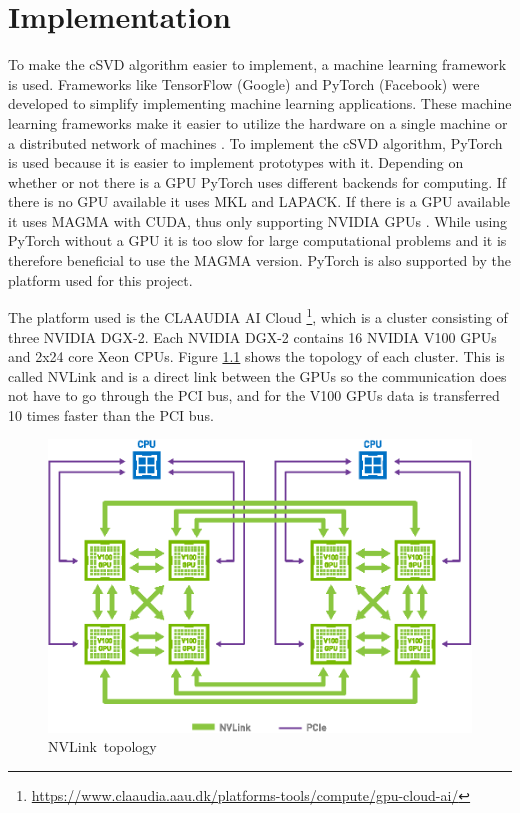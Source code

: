 \chapter{Implementation}

To make the cSVD algorithm easier to implement, a machine learning framework is used. Frameworks like TensorFlow (Google) \cite{tensorflow:about} and PyTorch (Facebook) \cite{pytorch:docs} were developed to simplify implementing machine learning applications. These machine learning frameworks make it easier to utilize the hardware on a single machine or a distributed network of machines \cite{pytorch:docs}. To implement the cSVD algorithm, PyTorch is used because it is easier to implement prototypes with it.  Depending on whether or not there is a GPU PyTorch uses different backends for computing. If there is no GPU available it uses MKL and LAPACK. If there is a GPU available it uses MAGMA with CUDA, thus only supporting NVIDIA GPUs \cite{pytorch:docs}. While using PyTorch without a GPU it is too slow for large computational problems and it is therefore beneficial to use the MAGMA version. PyTorch is also supported by the platform used for this project.

The platform used is the CLAAUDIA AI Cloud \footnote{\url{https://www.claaudia.aau.dk/platforms-tools/compute/gpu-cloud-ai/}}, which is a cluster consisting of three NVIDIA DGX-2. Each NVIDIA DGX-2 contains 16 NVIDIA V100 GPUs and 2x24 core Xeon CPUs. Figure \ref{fig:nvlink} shows the topology of each cluster. This is called NVLink and is a direct link between the GPUs so the communication does not have to go through the PCI bus, and for the V100 GPUs data is transferred 10 times faster than the PCI bus.

\begin{figure}[H]
  \centering
  \includegraphics[scale=0.6]{Figures/nvlink.eps}
  \caption[]{NVLink\protect\footnotemark\ topology}
  \label{fig:nvlink}
\end{figure}
  
